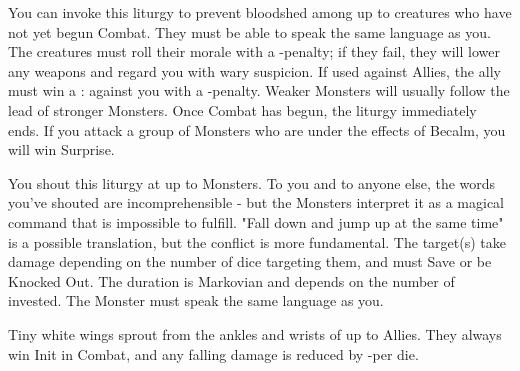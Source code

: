 {\LITURGY [
  Name= Becalm,
  Link= grey-lords-liturgy-becalm,
  Paradigm= Mind ,
  Save=  N ,
  Duration= Markovian ,
  Counter=  n/a  ,
  Keywords= Splittable ,
  Target=   Close or Nearby Monsters
]



You can invoke this liturgy to prevent bloodshed among up to \DICE creatures who have not yet begun Combat.  They must be able to speak the same language as you.  The creatures must roll their morale with a -\DICE penalty; if they fail, they will lower any weapons and regard you with wary suspicion.  If used against Allies, the ally must win a \RB : \FOC against you with a -\DICE penalty.  Weaker Monsters will usually follow the lead of stronger Monsters.  Once Combat has begun, the liturgy immediately ends.  If you attack a group of Monsters who are under the effects of Becalm, you will win Surprise.

\LITURGY [
  Name= Conflicting Command,
  Link=grey-lords-liturgy-conflicting command,
  Paradigm= Mind ,
  Save=  Y (negate Knocked Out effect) ,
  Duration= Markovian ,
  Counter=  n/a  ,
  Keywords= Splittable ,
  Target=   Close or Nearby Monsters
]



You shout this liturgy at up to \DICE Monsters.  To you and to anyone else, the words you've shouted are incomprehensible - but the Monsters interpret it as a magical command that is impossible to fulfill.  "Fall down and jump up at the same time" is a possible translation, but the conflict is more fundamental.  The target(s) take \DICE damage depending on the number of dice targeting them, and must Save or be Knocked Out.  The duration is Markovian and depends on the number of \DICE invested.  The Monster must speak the same language as you.

\LITURGY [
  Name= Duelists' Wings,
  Link=grey-lords-liturgy-duelists-wings,
  Paradigm= Biomancy ,
  Save=  0 ,
  Duration= Combat / \SUMDICE Minutes ,
  Counter=  n/a  ,
  Keywords= Splittable ,
  Target=   Close (touch) Allies or Self
]



Tiny white wings sprout from the ankles and wrists of up to \DICE Allies.  They always win Init in Combat, and any falling damage is reduced by -\DICE per die.

\LITURGY [
  Name= Resonating Command,
  Link=grey-lords-liturgy-resonating command,
  Paradigm= Mind ,
  Save=  Y (negates) ,
  Duration= Markovian ,
  Counter=  n/a  ,
  Keywords= Splittable ,
  Target=   Nearby creatures
]



}
